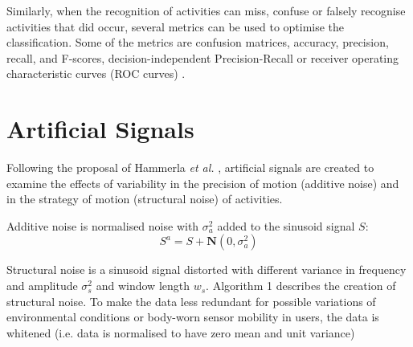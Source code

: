 \documentclass[10pt,journal,compsoc]{IEEEtran}
\begin{document}
Similarly, when the recognition of activities can miss, confuse or falsely
recognise activities that did occur, several metrics
can be used to optimise the classification. Some of the metrics
are confusion matrices, accuracy, precision, recall, and F-scores,
decision-independent Precision-Recall or receiver operating characteristic
curves (ROC curves) \cite{bulling2014}.



% 
% 
% 
% 
% 


\section{Artificial Signals}

Following the proposal of Hammerla \emph{et al.} \cite{hammerla2011},
artificial signals are created to examine the effects of
variability in the precision of motion  (additive noise) 
and in the strategy of motion  (structural noise) of 
activities.

Additive noise is normalised noise with $\sigma_a ^2$ added to the
sinusoid signal $S$: 
\begin{equation}
 S^a = S + \textbf{N}(0, \sigma_a ^2)
\end{equation} 

Structural noise is a sinusoid signal distorted with different variance in frequency and amplitude
$\sigma_s ^2$ and window length $w_s$. Algorithm 1 describes the creation of structural noise.
To make the data less redundant for possible variations of environmental 
conditions or body-worn sensor mobility in users, the data is whitened 
(i.e. data is normalised to have zero mean and unit variance) 
\end{document}
